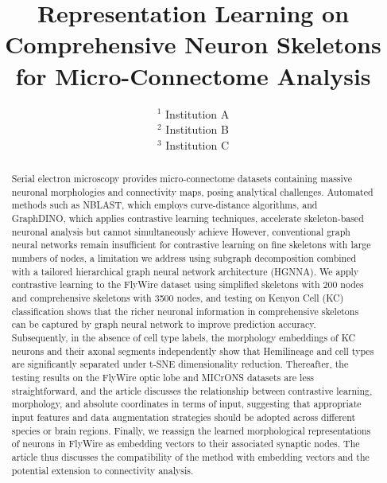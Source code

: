 \documentclass{article}
\title{Representation Learning on Comprehensive Neuron Skeletons for Micro-Connectome Analysis}
\author{
}
\date{
    $^1$ Institution A \\
    $^2$ Institution B \\
    $^3$ Institution C \\
}
\begin{document}
\maketitle
\begin{abstract}
Serial electron microscopy provides micro-connectome datasets containing massive neuronal morphologies and connectivity maps, posing analytical challenges.  
Automated methods such as NBLAST, which employs curve-distance algorithms, and GraphDINO, which applies contrastive learning techniques, accelerate skeleton-based neuronal analysis but cannot simultaneously achieve%
However, conventional graph neural networks remain insufficient for contrastive learning on fine skeletons with large numbers of nodes, a limitation we address using subgraph decomposition combined with a tailored hierarchical graph neural network architecture (HGNNA).  
We apply contrastive learning to the FlyWire dataset using simplified skeletons with 200 nodes and comprehensive skeletons with 3500 nodes, and testing on Kenyon Cell (KC) classification shows that the richer neuronal information in comprehensive skeletons can be captured by graph neural network to improve prediction accuracy. Subsequently, in the absence of cell type labels, the morphology embeddings of KC neurons and their axonal segments independently show that Hemilineage and cell types are significantly separated under t-SNE dimensionality reduction. Thereafter, the testing results on the FlyWire optic lobe and MICrONS datasets are less straightforward, and the article discusses the relationship between contrastive learning, morphology, and absolute coordinates in terms of input, suggesting that appropriate input features and data augmentation strategies should be adopted across different species or brain regions. Finally, we reassign the learned morphological representations of neurons in FlyWire as embedding vectors to their associated synaptic nodes. The article thus discusses the compatibility of the method with embedding vectors and the potential extension to connectivity analysis.
\end{abstract}
\end{document}
